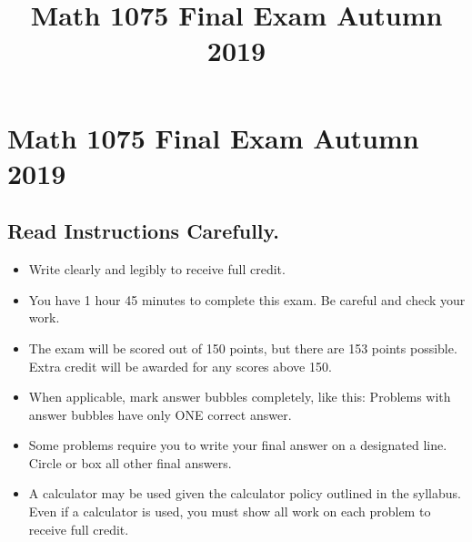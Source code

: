 \documentclass{ximera}
\title{Math 1075 Final Exam Autumn 2019}
\begin{document}
\section*{Math 1075 Final Exam Autumn 2019}
\subsection*{Read Instructions Carefully.}
\begin{itemize}
  \item Write clearly and legibly to receive full credit.
  \item You have 1 hour 45 minutes to complete this exam. Be careful and check your work.
  \item The exam will be scored out of 150 points, but there are 153 points possible. Extra credit will be awarded for any scores above 150.
  \item When applicable, mark answer bubbles completely, like this: Problems with answer bubbles have only ONE correct answer.
  \item Some problems require you to write your final answer on a designated line. Circle or box all other final answers.
  \item A calculator may be used given the calculator policy outlined in the syllabus. Even if a calculator is used, you must show all work on each problem to receive full credit.
\end{itemize}
\end{document}
